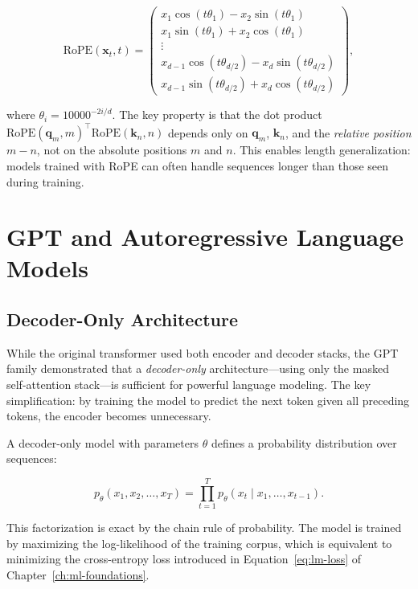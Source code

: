 \begin{equation}
\text{RoPE}(\mathbf{x}_t, t) = \begin{pmatrix}
x_1 \cos(t\theta_1) - x_2 \sin(t\theta_1) \\
x_1 \sin(t\theta_1) + x_2 \cos(t\theta_1) \\
\vdots \\
x_{d-1} \cos(t\theta_{d/2}) - x_d \sin(t\theta_{d/2}) \\
x_{d-1} \sin(t\theta_{d/2}) + x_d \cos(t\theta_{d/2})
\end{pmatrix},
\label{eq:rope}
\end{equation}

where $\theta_i = 10000^{-2i/d}$. The key property is that the dot product $\text{RoPE}(\mathbf{q}_m, m)^\top \text{RoPE}(\mathbf{k}_n, n)$ depends only on $\mathbf{q}_m$, $\mathbf{k}_n$, and the \emph{relative position} $m - n$, not on the absolute positions $m$ and $n$. This enables length generalization: models trained with RoPE can often handle sequences longer than those seen during training.

\section{GPT and Autoregressive Language Models}
\label{sec:gpt}

\subsection{Decoder-Only Architecture}

While the original transformer used both encoder and decoder stacks, the GPT family \citep{radford2019} demonstrated that a \emph{decoder-only} architecture---using only the masked self-attention stack---is sufficient for powerful language modeling. The key simplification: by training the model to predict the next token given all preceding tokens, the encoder becomes unnecessary.

A decoder-only model with parameters $\theta$ defines a probability distribution over sequences:

\begin{equation}
p_\theta(x_1, x_2, \ldots, x_T) = \prod_{t=1}^{T} p_\theta(x_t \mid x_1, \ldots, x_{t-1}).
\label{eq:autoregressive}
\end{equation}

This factorization is exact by the chain rule of probability. The model is trained by maximizing the log-likelihood of the training corpus, which is equivalent to minimizing the cross-entropy loss introduced in Equation~\ref{eq:lm-loss} of Chapter~\ref{ch:ml-foundations}.


